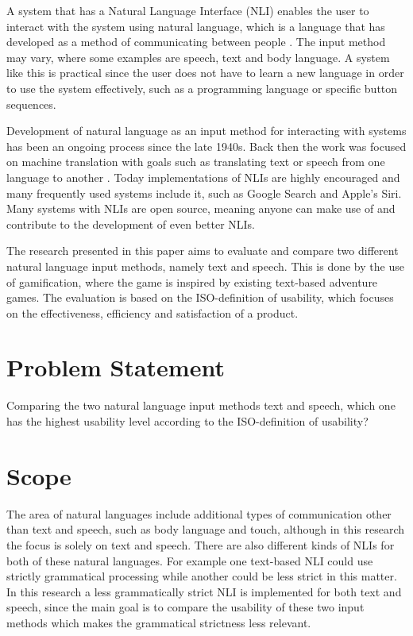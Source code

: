 A system that has a Natural Language Interface (NLI) enables the user to interact with the system using natural language, which is a language that has developed as a method of communicating between people \citep{NatLan}. The input method may vary, where some examples are speech, text and body language. A system like this is practical since the user does not have to learn a new language in order to use the system effectively, such as a programming language or specific button sequences.

Development of natural language as an input method for interacting with systems has been an ongoing process since the late 1940s. Back then the work was focused on machine translation with goals such as translating text or speech from one language to another \citep{Jones}. Today implementations of NLIs are highly encouraged and many frequently used systems include it, such as Google Search and Apple's Siri. Many systems with NLIs are open source, meaning anyone can make use of and contribute to the development of even better NLIs.

The research presented in this paper aims to evaluate and compare two different natural language input methods, namely text and speech. This is done by the use of gamification, where the game is inspired by existing text-based adventure games. The evaluation is based on the ISO-definition of usability, which focuses on the effectiveness, efficiency and satisfaction of a product. \citep{ISO}

\section{Problem Statement}
Comparing the two natural language input methods text and speech, which one has the highest usability level according to the ISO-definition of usability?

\section{Scope}
The area of natural languages include additional types of communication other than text and speech, such as body language and touch, although in this research the focus is solely on text and speech. There are also different kinds of NLIs for both of these natural languages. For example one text-based NLI could use strictly grammatical processing while another could be less strict in this matter. In this research a less grammatically strict NLI is implemented for both text and speech, since the main goal is to compare the usability of these two input methods which makes the grammatical strictness less relevant.

